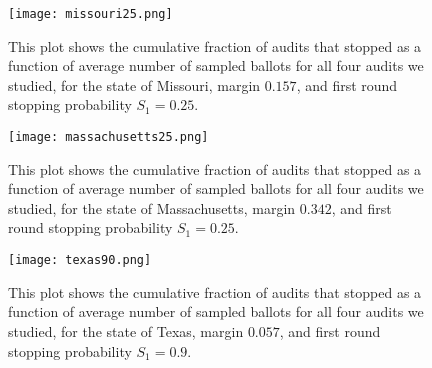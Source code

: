 \begin{figure}
\begin{centering}
\texttt{[image: missouri25.png]}
\caption{This plot shows the cumulative fraction of audits that stopped as a function of average number of sampled ballots for all four audits we studied, for the state of Missouri, margin $0.157$, and first round stopping probability $S_1=0.25$.}
\label{fig:missouri_25}
\end{centering}
\end{figure}

\begin{figure}
\begin{centering}
\texttt{[image: massachusetts25.png]}
\caption{This plot shows the cumulative fraction of audits that stopped as a function of average number of sampled ballots for all four audits we studied, for the state of Massachusetts, margin $0.342$, and first round stopping probability $S_1=0.25$.}
\label{fig:mass_25}
\end{centering}
\end{figure}

\begin{figure}
\begin{centering}
\texttt{[image: texas90.png]}
\caption{This plot shows the cumulative fraction of audits that stopped as a function of average number of sampled ballots for all four audits we studied, for the state of Texas, margin $0.057$, and first round stopping probability $S_1=0.9$.}
\label{fig:texas_90}
\end{centering}
\end{figure}

